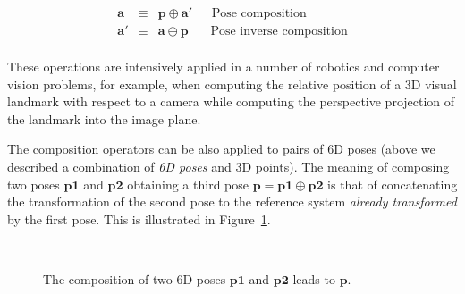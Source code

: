\documentclass[a4paper,11pt]{report}
\begin{document}
\begin{eqnarray*}
\mathbf{a} & \equiv & \mathbf{p} \oplus \mathbf{a}'   ~~~~~~~ \textrm{Pose composition} \\
\mathbf{a'} & \equiv & \mathbf{a} \ominus \mathbf{p}  ~~~~~~~~ \textrm{Pose inverse composition} \\
\end{eqnarray*}

These operations are intensively applied in a number of robotics and computer vision
problems, for example, when computing the relative position of a 3D visual landmark
with respect to a camera while computing the perspective projection of the landmark
into the image plane.

The composition operators can be also applied to pairs of 6D poses (above we described a combination
of \emph{6D poses} and {3D points}).
The meaning of composing two poses $\mathbf{p1}$ and $\mathbf{p2}$
obtaining a third pose $\mathbf{p} = \mathbf{p1} \oplus \mathbf{p2}$
is that of concatenating the transformation of the second pose to the reference system
\emph{already transformed} by the first pose.
This is illustrated in Figure~\ref{fig:comp_2poses}.

\begin{figure}[h!]
\centering
{}
 \\
\caption{The composition of two 6D poses $\mathbf{p1}$ and $\mathbf{p2}$ leads to $\mathbf{p}$.}
\label{fig:comp_2poses}
\end{figure}
\end{document}
